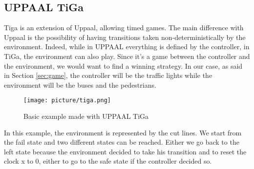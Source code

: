 \subsection{UPPAAL TiGa}
 Tiga is an extension of Uppaal, allowing timed games. The main difference with Uppaal is the possibility of having transitions taken non-deterministically by the environment. Indeed, while in UPPAAL everything is defined by the controller, in TiGa, the environment can also play. Since it's a game between the controller and the environment, we would want to find a winning strategy. In our case, as said in Section \ref{sec:game}, the controller will be the traffic lights while the environment will be the buses and the pedestrians.
 \begin{figure}[H]\label{fig:tiga}
  \begin{center}
    \texttt{[image: picture/tiga.png]}
    \caption{Basic example made with UPPAAL TiGa}
  \end{center}
\end{figure}
In this example, the environment is represented by the cut lines. We start from the fail state and two different states can be reached. Either we go back to the left state because the environment decided to take his transition and to reset the clock x to 0, either to go to the safe state if the controller decided so. 